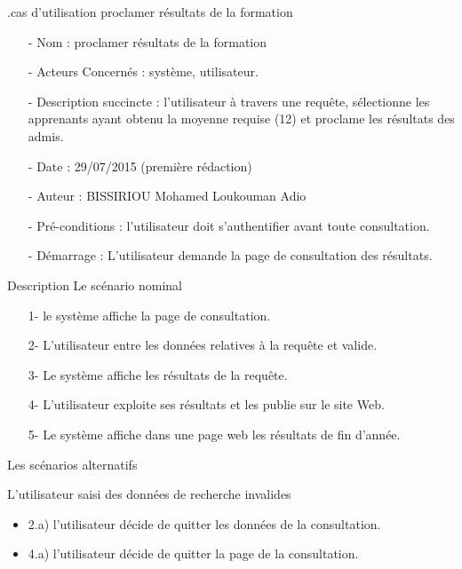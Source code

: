 	\begin{bf}
	 .cas d'utilisation proclamer résultats de la formation
	\end{bf}

	\begin{itemize}
	\item[-]Nom : proclamer résultats de la formation 
	\item[-]Acteurs Concernés : système, utilisateur.
	\item[-]Description succincte : l'utilisateur à travers une requête, 	sélectionne les apprenants ayant obtenu la moyenne requise (12) et proclame les résultats des admis.
	\item[-]Date : 29/07/2015 (première rédaction)
	\item[-]Auteur : BISSIRIOU Mohamed Loukouman Adio
	\item[-]Pré-conditions : l'utilisateur doit s'authentifier avant toute consultation.
	\item[-]Démarrage : L'utilisateur demande la page de consultation des résultats.
	\end{itemize}
	\begin{bf}
	Description 
	Le scénario nominal
	\end{bf}
	\begin{itemize}
		\item[1-]le système affiche la page de consultation.
		\item[2-]L'utilisateur entre les données relatives à la requête et valide.
		\item[3-]Le système affiche les résultats de la requête.
		\item[4-]L'utilisateur exploite ses résultats et les publie sur le site Web.
		\item[5-]Le système affiche dans une page web les résultats de fin d'année.
	
	\end{itemize}
		
		\begin{bf}
		Les scénarios alternatifs
		\end{bf}
		
		L'utilisateur saisi des données de recherche invalides
		\begin{itemize}
			\item 2.a) l'utilisateur décide de quitter les données de la consultation. 
			\item 4.a) l'utilisateur décide de quitter la page de la consultation.
		
		\end{itemize}
		
